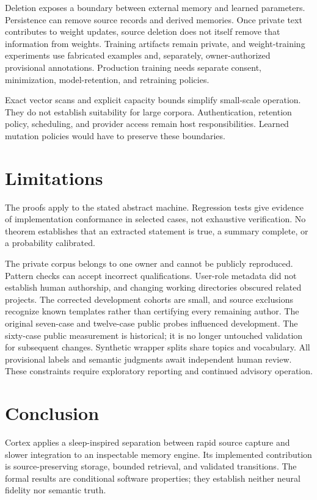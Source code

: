 \documentclass[11pt]{article}
\begin{document}
Deletion exposes a boundary between external memory and learned parameters. Persistence can remove source records and derived memories. Once private text contributes to weight updates, source deletion does not itself remove that information from weights. Training artifacts remain private, and weight-training experiments use fabricated examples and, separately, owner-authorized provisional annotations. Production training needs separate consent, minimization, model-retention, and retraining policies.

Exact vector scans and explicit capacity bounds simplify small-scale operation. They do not establish suitability for large corpora. Authentication, retention policy, scheduling, and provider access remain host responsibilities. Learned mutation policies would have to preserve these boundaries.



\section{Limitations}
The proofs apply to the stated abstract machine. Regression tests give evidence of implementation conformance in selected cases, not exhaustive verification. No theorem establishes that an extracted statement is true, a summary complete, or a probability calibrated.

The private corpus belongs to one owner and cannot be publicly reproduced. Pattern checks can accept incorrect qualifications. User-role metadata did not establish human authorship, and changing working directories obscured related projects. The corrected development cohorts are small, and source exclusions recognize known templates rather than certifying every remaining author. The original seven-case and twelve-case public probes influenced development. The sixty-case public measurement is historical; it is no longer untouched validation for subsequent changes. Synthetic wrapper splits share topics and vocabulary. All provisional labels and semantic judgments await independent human review. These constraints require exploratory reporting and continued advisory operation.



\section{Conclusion}
Cortex applies a sleep-inspired separation between rapid source capture and slower integration to an inspectable memory engine. Its implemented contribution is source-preserving storage, bounded retrieval, and validated transitions. The formal results are conditional software properties; they establish neither neural fidelity nor semantic truth.
\end{document}
